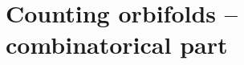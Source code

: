 \chapter{Counting orbifolds -- combinatorical part}\label{Counting orbifolds -- combinatorical part}
